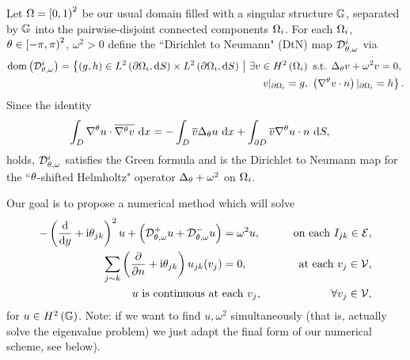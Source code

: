 \documentclass[11pt]{report}
\newcommand{\DtN}{\mathcal{D}}
\newcommand{\di}{\DtN_{\qm, \omega}^i}
\newcommand{\dplus}{\DtN_{\qm, \omega}^+}
\newcommand{\dminus}{\DtN_{\qm, \omega}^-}
\newcommand{\dom}{\mathrm{dom}}
\newcommand{\gradgradSob}[1]{H^2\bracs{#1}}
\begin{document}
Let $\Omega=\left[0,1\right)^2$ be our usual domain filled with a singular structure $\mathbb{G}$, separated by $\mathbb{G}$ into the pairwise-disjoint connected components $\Omega_i$.
For each $\Omega_i$, $\theta\in\left[-\pi,\pi\right)^2$, $\omega^2>0$ define the ``Dirichlet to Neumann" (DtN) map $\di$ via
\begin{align*}
	\dom\bracs{\di} = \clbracs{ \bracs{g,h}\in\ltwo{\partial\ddom_i}{S}\times\ltwo{\partial\ddom_i}{S} \setVert \exists v\in \gradgradSob{\ddom_i} \text{ s.t. }  \laplacian_{\qm}v+\omega^2v=0, \right. \\
	 \left. v\vert_{\partial\ddom_i}=g, \ \bracs{\tgrad v\cdot n}\vert_{\partial\ddom_i}=h }.
\end{align*}
Since the identity
\begin{align*}
	\int_{D}\nabla^{\theta} u\cdot\overline{\nabla^{\theta} v} \ \mathrm{d}x 
	&= -\int_{D}\overline{v}\Delta_{\theta}u \ \mathrm{d}x
	+ \int_{\partial D}\overline{v}\nabla^{\theta} u\cdot n \ \mathrm{d}S,
\end{align*}
holds, $\di$ satisfies the Green formula and is the Dirichlet to Neumann map for the ``$\theta$-shifted Helmholtz" operator $\Delta_{\theta}+\omega^2$ on $\Omega_i$.

Our goal is to propose a numerical method which will solve
\begin{align*}
	-\bracs{\diff{}{y} + \rmi\qm_{jk}}^2 u + \bracs{\dplus u + \dminus u} &= \omega^2 u, &\qquad\text{on each } I_{jk}\in\edgeSet, \\
	\sum_{j\con k} \bracs{\pdiff{}{n} + \rmi\qm_{jk}}u_{jk}(v_j) &= 0, &\qquad\text{at each } v_j\in\vertSet, \\
	u \text{ is continuous at } & \text{each } v_j, &\qquad\forall v_j\in\vertSet,
\end{align*}
for $u\in\gradgradSob{\graph}$.
Note: if we want to find $u,\omega^2$ simultaneously (that is, actually solve the eigenvalue problem) we just adapt the final form of our numerical scheme, see below).
\end{document}
